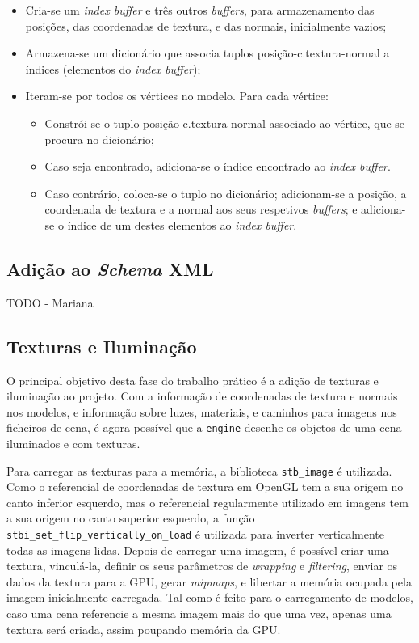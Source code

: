 \documentclass[12pt, a4paper]{article}
\begin{document}
\begin{itemize}
    \item Cria-se um \emph{index buffer} e três outros \emph{buffers}, para armazenamento das
        posições, das coordenadas de textura, e das normais, inicialmente vazios;

    \item Armazena-se um dicionário que associa tuplos posição-c.textura-normal a índices (elementos
        do \emph{index buffer});

    \item Iteram-se por todos os vértices no modelo. Para cada vértice:
        \begin{itemize}
            \item Constrói-se o tuplo posição-c.textura-normal associado ao vértice, que se procura
                no dicionário;
            \item Caso seja encontrado, adiciona-se o índice encontrado ao \emph{index buffer}.
            \item Caso contrário, coloca-se o tuplo no dicionário; adicionam-se a posição, a
                coordenada de textura e a normal aos seus respetivos \emph{buffers}; e adiciona-se o
                índice de um destes elementos ao \emph{index buffer}.
        \end{itemize}
\end{itemize}

\subsection{Adição ao \emph{Schema} XML}

{\color{red} TODO - Mariana}

\subsection{Texturas e Iluminação}

O principal objetivo desta fase do trabalho prático é a adição de texturas e iluminação ao projeto.
Com a informação de coordenadas de textura e normais nos modelos, e informação sobre luzes,
materiais, e caminhos para imagens nos ficheiros de cena, é agora possível que a \texttt{engine}
desenhe os objetos de uma cena iluminados e com texturas.

Para carregar as texturas para a memória, a biblioteca \texttt{stb\_image} \cite{stb-image} é
utilizada. Como o referencial de coordenadas de textura em OpenGL tem a sua origem no canto inferior
esquerdo, mas o referencial regularmente utilizado em imagens tem a sua origem no canto superior
esquerdo, a função \texttt{stbi\_set\_flip\_vertically\_on\_load} é utilizada para inverter
verticalmente todas as imagens lidas. Depois de carregar uma imagem, é possível criar uma textura,
vinculá-la, definir os seus parâmetros de \emph{wrapping} e \emph{filtering}, enviar os dados da
textura para a GPU, gerar \emph{mipmaps}, e libertar a memória ocupada pela imagem inicialmente
carregada. Tal como é feito para o carregamento de modelos, caso uma cena referencie a mesma imagem
mais do que uma vez, apenas uma textura será criada, assim poupando memória da GPU.
\end{document}
